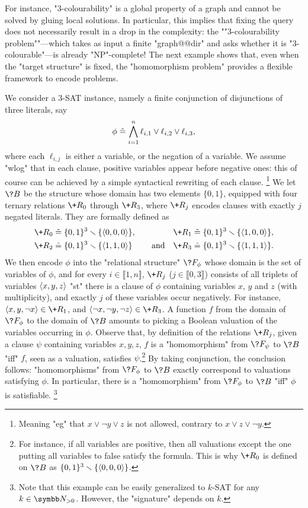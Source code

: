 For instance, "$3$-colourability" is a global property of a graph and cannot be solved
by gluing local solutions. In particular, this implies that fixing the query
does not necessarily result in
a drop in the complexity: the \AP ""$3$-colourability problem""---which takes as input a finite "graph@@dir" and asks whether it is "$3$-colourable"---is already "NP"-complete!
The next example shows that, even when the "target structure" is fixed, the "homomorphism problem"
provides a flexible framework to encode problems.

\begin{example}
	\AP\label{ex:sat-as-hom}
	We consider a 3-SAT instance, namely a finite conjunction of
	disjunctions of three literals, say
	\[
		\phi \mathrel{\hat{=}} \bigwedge_{i=1}^n \ell_{i,1} \lor \ell_{i,2} \lor \ell_{i,3},
	\]
	where each $\ell_{i,j}$ is either a variable, or the negation of a variable.
	We assume "wlog" that in each clause, positive variables appear before negative ones:
	this of course can be achieved by a simple syntactical rewriting of each clause.%
	\footnote{Meaning "eg" that $x \lor \neg y \lor z$ is not allowed, contrary to
	$x \lor z \lor \neg y$.}
	We let $\?B$ be the structure whose domain has two elements $\{0,1\}$,
	equipped with four ternary relations $\+R_0$ through $\+R_3$, where $\+R_j$ encodes clauses with exactly $j$ negated literals. They are formally defined as
	\begin{align*}
		\+R_0 & \defeq \set{0,1}^3 \smallsetminus \set{\tup{0,0,0}}, &
		\+R_1 & \defeq \set{0,1}^3 \smallsetminus \set{\tup{1,0,0}}, \\
		\+R_2 & \defeq \set{0,1}^3 \smallsetminus \set{\tup{1,1,0}} \qquad\text{ and} &
		\+R_3 & \defeq \set{0,1}^3 \smallsetminus \set{\tup{1,1,1}}.
	\end{align*}
	We then encode $\phi$ into the "relational structure" $\?F_\phi$
	whose domain is the set of variables of $\phi$,
	and for every $i \in \lBrack 1,n \rBrack$,
	$\+R_j$ ($j\in\lBrack 0,3\rBrack$) consists of all triplets of variables $\langle x,y,z\rangle$
	"st" there is a clause of $\phi$ containing variables $x$, $y$ and $z$ (with multiplicity), and exactly $j$ of these variables occur negatively.
	For instance, $\tup{x, y, \neg x} \in \+R_1$, and $\tup{\neg x, \neg y, \neg z} \in \+R_3$.
	A function $f$ from the domain of $\?F_\phi$ to the domain of $\?B$ amounts to picking
	a Boolean valuation of the variables occurring in $\phi$.
	Observe that, by definition of the relations $\+R_j$,
	given a clause $\psi$ containing variables $x,y,z$, 
	$f$ is a "homomorphism" from $\?F_\psi$ to $\?B$ "iff"
	$f$, seen as a valuation, satisfies $\psi$.\footnote{For instance,
	if all variables are positive, then all valuations except the one putting
	all variables to false satisfy the formula. This is why $\+R_0$ is defined
	on $\?B$ as $\{0,1\}^3\smallsetminus \{\langle0,0,0\rangle\}$.}
	By taking conjunction, the conclusion follows: "homomorphisms" from
	$\?F_\phi$ to $\?B$ exactly correspond to valuations satisfying $\phi$.
	In particular, there is a "homomorphism" from $\?F_\phi$ to $\?B$ "iff"
	$\phi$ is satisfiable.%
	\footnote{Note that this example can be easily generalized to $k$-SAT for any $k\in\Np$.
	However, the "signature" depends on $k$.}
\end{example}

